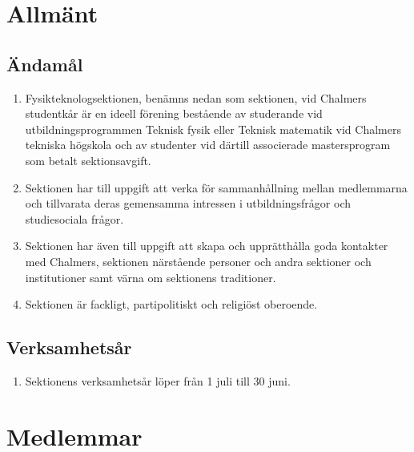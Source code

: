 \documentclass[11pt,a4paper]{article}
\begin{document}
\clearpage
\tableofcontents
\clearpage




\section{Allmänt}


\subsection{Ändamål}
\begin{enumerate}[\thesubsection.1]

  \item Fysikteknologsektionen, benämns nedan som sektionen, vid Chalmers studentkår är en ideell förening bestående av studerande vid utbildningsprogrammen Teknisk fysik eller Teknisk matematik vid Chalmers tekniska högskola och av studenter vid därtill associerade mastersprogram som betalt sektionsavgift.

  \item Sektionen har till uppgift att verka för samman\-hållning mellan
  med\-lem\-mar\-na och tillvarata deras gemensamma intressen i
  ut\-bild\-nings\-fråg\-or och studiesociala frågor.

  \item Sektionen har även till uppgift att skapa och upprätthålla
  goda kontakter med Chalmers, sektionen närstående personer och andra
  sektioner och institutioner samt värna om sektionens traditioner.

  \item Sektionen är fackligt, partipolitiskt och religiöst oberoende.

\end{enumerate}



\subsection{Verksamhetsår}
\begin{enumerate}[\thesubsection.1]

  \item Sektionens verksamhetsår löper från 1 juli till 30 juni.

\end{enumerate}


\newpage



\section{Medlemmar}
\end{document}
